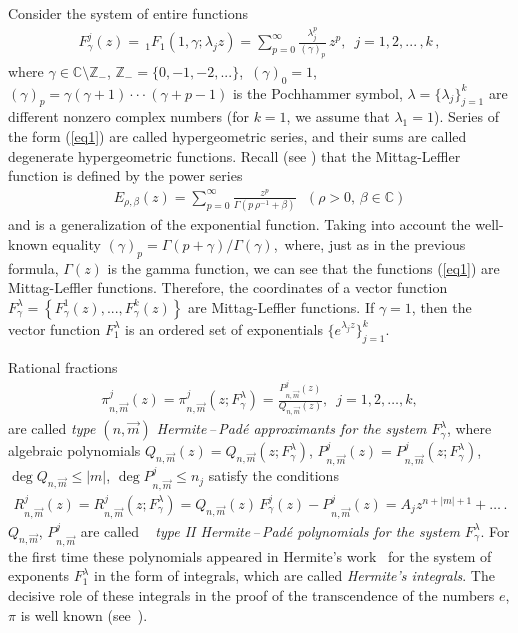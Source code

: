 \documentclass[
11pt,%
tightenlines,%
twoside,%
onecolumn,%
nofloats,%
nobibnotes,%
nofootinbib,%
superscriptaddress,%
noshowpacs,%
centertags]%
{revtex4}
\begin{document}
Consider the system of entire functions
\begin{eqnarray}\label{eq1}
  F^j_{\gamma}(z)=\,_1F_1(1,\gamma;\lambda_jz)=
\sum_{p=0}^{\infty}\frac{\lambda_j^p}{(\gamma)_p}\,z^p,\,\,\,
j=1,2,...\,,k\,,
\end{eqnarray}
where $\gamma\in\mathbb{C}\setminus \mathbb{Z_{-}}$,
$\mathbb{Z_{-}}=\{0,-1,-2,...\}$, \,$(\gamma)_0=1$,
$(\gamma)_p=\gamma(\gamma+1)\cdot\cdot\cdot(\gamma+p-1)$ is the 
Pochhammer symbol, $\lambda=\{\lambda_j\}_{j=1}^k$ are
different nonzero complex numbers (for $k=1$, we assume that 
$\lambda_1=1$). Series of the form (\ref{eq1}) are called 
hypergeometric series, and their sums are called degenerate
hypergeometric functions. Recall (see \cite{Lef,Dz}) that the
Mittag-Leffler function is defined by the power series
\begin{eqnarray*}
E_{\rho,\beta}(z)=\sum_{p=0}^{\infty}\frac{z^p}{\Gamma(p\,\rho^{-1}
	+\beta)}\,\,\,\,(\rho>0,\, \beta\in \mathbb{C})
\end{eqnarray*}
and is a generalization of the exponential function.
Taking into account the well-known equality
$(\gamma)_p=\Gamma(p+\gamma)/\Gamma(\gamma)$,\,
where, just as in the previous formula, $\Gamma(z)$
is the gamma function, we can see that the functions
(\ref{eq1}) are Mittag-Leffler functions. Therefore, the
coordinates of a vector function $F_{\gamma}^{\lambda}=
\left\{F^1_\gamma(z),...,F^k_\gamma(z)\right\}$ are
Mittag-Leffler functions. If $\gamma=1$, then the vector
function $F_1^{\lambda}$ is an ordered set of exponentials
$\{e^{\lambda_jz}\}_{j=1}^k$.

Rational fractions
\begin{eqnarray*}
\pi_{n,\overrightarrow{m}}^j(z)=\pi_{n,\overrightarrow{m}}^j(z;F^{\lambda}_{\gamma})=
\frac{P_{n,\overrightarrow{m}}^j(z)}{Q_{n,\overrightarrow{m}}(z)}
,\,\,\,j=1,2,\ldots,k,
\end{eqnarray*}
are called  {\it type $(n,\overrightarrow{m})$ Hermite\,--\,Pad\'e 
approximants for the system $F^{\lambda}_{\gamma}$}, where algebraic polynomials
$Q_{n,\overrightarrow{m}}(z)=Q_{n,\overrightarrow{m}}(z;F^{\lambda}_{\gamma})$,
$P^j_{n,\overrightarrow{m}}(z)=P_{n,\overrightarrow{m}}^j(z;F^{\lambda}_{\gamma})$,
$\deg Q_{n,\overrightarrow{m}}\leqslant |m|$, $\deg
P_{n,\overrightarrow{m}}^j\leqslant n_j$ satisfy the conditions
\begin{eqnarray*}
R_{n,\overrightarrow{m}}^j(z)=
R_{n,\overrightarrow{m}}^j(z;F^{\lambda}_{\gamma})=
Q_{n,\overrightarrow{m}}(z)\,
F^j_\gamma(z)-P_{n,\overrightarrow{m}}^j(z)= A_j
z^{n+|m|+1}+\ldots\,.
\end{eqnarray*}
 $Q_{n,\overrightarrow{m}}$,
$P^j_{n,\overrightarrow{m}}$ are called~\cite{Stahl}\,\, {\it
type II Hermite\,--\,Pad\'e polynomials for the system
$F^{\lambda}_{\gamma}$}. For the first time these polynomials appeared in
Hermite's  work~\cite{Her} for the system of exponents 
$F^{\lambda}_{1}$ in the form of integrals, which are 
called {\it Hermite's integrals}. The decisive role of
 these integrals in the proof of the transcendence of the 
 numbers $e$, $\pi$ is well known (see~\cite{Klein}).
\end{document}
